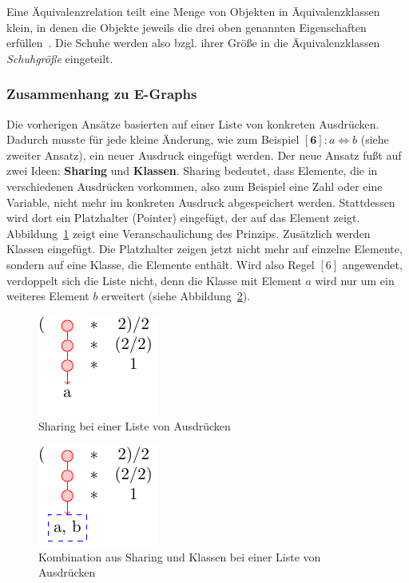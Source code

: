 Eine Äquivalenzrelation teilt eine Menge von Objekten in Äquivalenzklassen klein, in denen die Objekte jeweils die drei oben genannten Eigenschaften erfüllen~\cite{Ehrig2001}.
Die Schuhe werden also bzgl. ihrer Größe in die Äquivalenzklassen \textit{Schuhgröße} eingeteilt.

\subsubsection{Zusammenhang zu E-Graphs}

Die vorherigen Ansätze basierten auf einer Liste von konkreten Ausdrücken. Dadurch musste für jede kleine Änderung, wie zum Beispiel $[\mathbf{6}]: a \Leftrightarrow b$ (siehe zweiter Ansatz),
ein neuer Ausdruck eingefügt werden. Der neue Ansatz fußt auf zwei Ideen: \textbf{Sharing} und \textbf{Klassen}.
Sharing bedeutet, dass Elemente, die in verschiedenen Ausdrücken vorkommen, also zum Beispiel eine Zahl oder eine Variable, nicht mehr im konkreten Ausdruck abgespeichert werden.
Stattdessen wird dort ein Platzhalter (Pointer) eingefügt, der auf das Element zeigt. Abbildung~\ref{fig:sharing} zeigt eine Veranschaulichung des Prinzips.
Zusätzlich werden Klassen eingefügt. Die Platzhalter zeigen jetzt nicht mehr auf einzelne Elemente, sondern auf eine Klasse, die Elemente enthält. Wird also Regel $[6]$ angewendet,
verdoppelt sich die Liste nicht, denn die Klasse mit Element $a$ wird nur um ein weiteres Element $b$ erweitert (siehe Abbildung~\ref{fig:classes}). 

{
\begin{minipage}[c]{0.5\linewidth}
    \begin{figure}[H]
        \centering
        \includegraphics[scale=1.6]{../fig/sharing.pdf}
        \caption{Sharing bei einer Liste von Ausdrücken}
        \label{fig:sharing}
    \end{figure}
    \end{minipage}
    \begin{minipage}[c]{0.5\linewidth}
    \begin{figure}[H]
        \centering
        \includegraphics[scale=1.6]{../fig/classes.pdf}
        \caption{Kombination aus Sharing und Klassen bei einer Liste von Ausdrücken}
        \label{fig:classes}
    \end{figure}
\end{minipage}}


